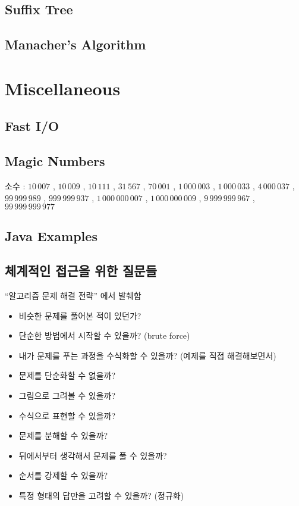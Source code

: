 \documentclass[10pt,landscape,a4paper,twocolumn]{article}
\begin{document}
\subsection{Suffix Tree}

\subsection{Manacher's Algorithm}



\section{Miscellaneous}

\subsection{Fast I/O}


\subsection{Magic Numbers}

소수 : $10\,007$ , $10\,009$ , $10\,111$ , $31\,567$ , $70\,001$ , $1\,000\,003$ , $1\,000\,033$ , $4\,000\,037$ , $99\,999\,989$ , $999\,999\,937$ , $1\,000\,000\,007$ , $1\,000\,000\,009$ , $9\,999\,999\,967$ , $99\,999\,999\,977$



\subsection{Java Examples}



\subsection{체계적인 접근을 위한 질문들}

``알고리즘 문제 해결 전략'' 에서 발췌함
\begin{itemize}
\item 비슷한 문제를 풀어본 적이 있던가?
\item 단순한 방법에서 시작할 수 있을까? (brute force)
\item 내가 문제를 푸는 과정을 수식화할 수 있을까? (예제를 직접 해결해보면서)
\item 문제를 단순화할 수 없을까?
\item 그림으로 그려볼 수 있을까?
\item 수식으로 표현할 수 있을까?
\item 문제를 분해할 수 있을까?
\item 뒤에서부터 생각해서 문제를 풀 수 있을까?
\item 순서를 강제할 수 있을까?
\item 특정 형태의 답만을 고려할 수 있을까? (정규화)
\end{itemize}
\end{document}
